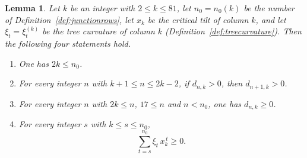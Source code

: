 \documentclass{amsart}
\newtheorem{lemma}[theorem]{Lemma}
\theoremstyle{definition}
\theoremstyle{remark}
\numberwithin{equation}{section}
\begin{document}
\begin{lemma}\label{lem:smallcolumns}
Let $k$ be an integer with $2\le k\le81$, let $n_0=n_0(k)$ be the number of
Definition~\ref{def:junctionrows}, let $x_k$ be the critical tilt of column
$k$, and let $\xi_t=\xi^{(k)}_t$ be the tree curvature of column $k$
(Definition~\ref{def:treecurvature}). Then the following four statements
hold.
\begin{enumerate}
\item One has $2k\le n_0$.
\item For every integer $n$ with $k+1\le n\le2k-2$, if $d_{n,k}>0$, then
$d_{n+1,k}>0$.
\item For every integer $n$ with $2k\le n$, $17\le n$ and $n<n_0$, one has
$d_{n,k}\ge0$.
\item For every integer $s$ with $k\le s\le n_0$,
\[
\sum_{t=s}^{n_0}\xi_t\,x_k^{\,t}\ge0.
\]
\end{enumerate}
\end{lemma}
\end{document}
